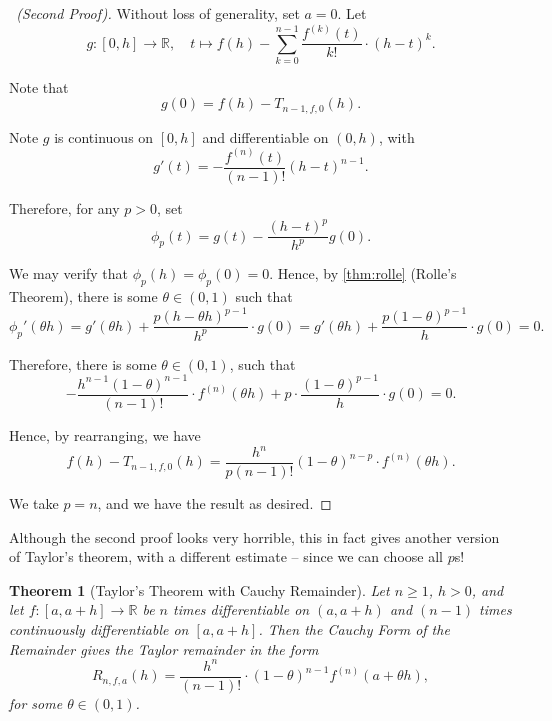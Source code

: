 \documentclass[11pt]{article}
\numberwithin{equation}{section}
\newtheorem{theorem}{Theorem}[section]
\theoremstyle{definition}
\theoremstyle{remark}
\newcommand{\pqty}[1]{\left(#1\right)}
\newcommand{\ccintv}[2]{[#1,#2]}
\newcommand{\oointv}[2]{(#1,#2)}
\newcommand{\functiondomain}[3]{#1:#2\to #3}
\newcommand{\function}[5]{#1:#2\to #3,\quad #4\mapsto #5}
\newcommand{\RR}{\mathbb R}
\begin{document}
\begin{proof}[\proofname\ (Second Proof)]
    Without loss of generality, set \(a = 0\). Let
    \[
        \function{g}{\ccintv{0}{h}}{\RR}{t}{f\pqty{h} - \sum_{k = 0}^{n - 1} \frac{f^{\pqty{k}} \pqty{t}}{k!} \cdot \pqty{h - t}^{k}.}
    \]

    Note that
    \[
        g\pqty{0} = f\pqty{h} - T_{n - 1, f, 0} \pqty{h}.
    \]  

    Note \(g\) is continuous on \(\ccintv{0}{h}\) and differentiable on \(\oointv{0}{h}\), with
    \[
        g'\pqty{t} = - \frac{f^{\pqty{n}}\pqty{t}}{\pqty{n - 1}!} \pqty{h - t}^{n - 1}.
    \]

    Therefore, for any \(p > 0\), set
    \[
        \phi_{p} \pqty{t} = g\pqty{t} - \frac{\pqty{h - t}^{p}}{h^p} g\pqty{0}.
    \]

    We may verify that \(\phi_{p} \pqty{h} = \phi_p \pqty{0} = 0\). Hence, by \autoref{thm:rolle} (Rolle's Theorem), there is some \(\theta \in \oointv{0}{1}\) such that
    \[
        \phi_p' \pqty{\theta h} = g' \pqty{\theta h} + \frac{p \pqty{h - \theta h}^{p - 1}}{h^p} \cdot g\pqty{0} = g'\pqty{\theta h} + \frac{p \pqty{1 - \theta}^{p - 1}}{h} \cdot g\pqty{0} = 0.
    \]

    Therefore, there is some \(\theta \in \oointv{0}{1}\), such that
    \[
        - \frac{h^{n - 1} \pqty{1 - \theta}^{n - 1}}{\pqty{n - 1}!} \cdot f^{\pqty{n}} \pqty{\theta h} + p \cdot \frac{\pqty{1 - \theta}^{p - 1}}{h} \cdot g\pqty{0} = 0.
    \]

    Hence, by rearranging, we have
    \[
        f\pqty{h} - T_{n - 1, f, 0} \pqty{h} = \frac{h^n}{p \pqty{n - 1}!} \pqty{1 - \theta}^{n - p} \cdot f^{\pqty{n}} \pqty{\theta h}.
    \]

    We take \(p = n\), and we have the result as desired.
\end{proof}

Although the second proof looks very horrible, this in fact gives another version of Taylor's theorem, with a different estimate -- since we can choose all \(p\)s!

\begin{theorem}[Taylor's Theorem with Cauchy Remainder]\label{analysis-unit-0130}
    \label{thm:taylor-thm-cauchy-remainder}%
    Let \(n\ge1\), \(h>0\), and let \(\functiondomain{f}{\ccintv{a}{a + h}}{\RR}\) be \(n\) times differentiable on \(\oointv{a}{a + h}\) and \(\pqty{n - 1}\) times continuously differentiable on \(\ccintv{a}{a + h}\). Then the \emph{Cauchy Form of the Remainder} gives the Taylor remainder in the form
    \[
        R_{n, f, a} \pqty{h} = \frac{h^{n}}{\pqty{n - 1}!} \cdot \pqty{1 - \theta}^{n - 1} f^{\pqty{n}} \pqty{a + \theta h},
    \]
    for some \(\theta \in \oointv{0}{1}\).
\end{theorem}
\end{document}
